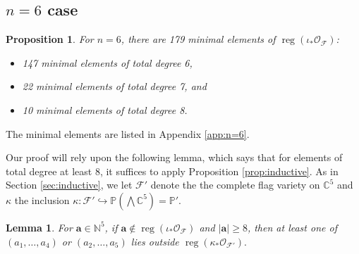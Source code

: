 \documentclass[12pt,reqno]{amsart}
\newtheorem{lemma}[theorem]{Lemma}
\newtheorem{proposition}[theorem]{Proposition}
\theoremstyle{definition}
\theoremstyle{remark}
\newcommand{\reg}{\operatorname{reg}}
\newcommand{\calF}{{\mathcal{F}}}
\newcommand{\calO}{{\mathcal{O}}}
\begin{document}

\subsection{$n=6$ case}

\begin{proposition}\label{prop:n=6}
    For $n=6$, there are 179 minimal elements of $\reg(\iota_*\calO_{\calF})$:
    \begin{itemize}
        \item 147 minimal elements of total degree 6,
        \item 22 minimal elements of total degree 7, and
        \item 10 minimal elements of total degree 8.
    \end{itemize}
\end{proposition}

The minimal elements are listed in Appendix \ref{app:n=6}.

Our proof will rely upon the following lemma, which says  that for elements of total degree at least $8$, it suffices to apply Proposition \ref{prop:inductive}.  As in Section \ref{sec:inductive}, we let $\calF'$ denote the the complete flag variety on $\mathbb C^{5}$ and $\kappa$ the inclusion $\kappa: \calF' \hookrightarrow \mathbb P\left(\bigwedge\mathbb C^{5}\right)= \mathbb P'$.

\begin{lemma}\label{lemma:n=6}
    For $\mathbf a \in \mathbb N^5$, if $\mathbf a \notin \reg(\iota_*\calO_{\calF})$ and $|\mathbf a| \geq 8$, then at least one of $(a_1,\ldots,a_4)$ or $(a_2,\ldots,a_5)$ lies outside $\reg(\kappa_*\calO_{\calF'}).$
\end{lemma}
\end{document}

